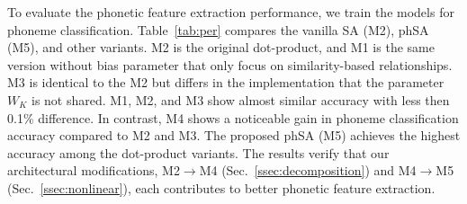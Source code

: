 To evaluate the phonetic feature extraction performance, we train the models for phoneme classification.
Table~\ref{tab:per} compares the vanilla SA (M2), phSA (M5), and other variants.
M2 is the original dot-product, and M1 is the same version without bias parameter that only focus on similarity-based relationships.
M3 is identical to the M2 but differs in the implementation that the parameter $W_K$ is not shared.
M1, M2, and M3 show almost similar accuracy with less then 0.1\% difference.
In contrast, M4 shows a noticeable gain in phoneme classification accuracy compared to M2 and M3.
The proposed phSA (M5) achieves the highest accuracy among the dot-product variants.
The results verify that our architectural modifications, M2$\rightarrow$M4 (Sec.~\ref{ssec:decomposition}) and M4$\rightarrow$M5 (Sec.~\ref{ssec:nonlinear}), each contributes to better phonetic feature extraction.


\begin{table}[t]
    \centering 
    \caption{Word error rate (\%) of different configurations of phonetic self-attention layers.
    The baseline performance (without phSA) is presented in the first row.
    The best results are in bold, and the second best results are underlined.}
    \vspace{-0.2cm}
    \label{tab:wer}
\end{table}


